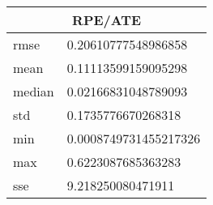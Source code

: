 \begin{table}[!ht] 
 \centering 
 \begin{tabular}{|l|l|} \hline 
 \multicolumn{2}{|c|}{RPE/ATE} \\ \hline 
 rmse & 0.20610777548986858 \\ \hline 
mean & 0.11113599159095298 \\ \hline 
median & 0.02166831048789093 \\ \hline 
std & 0.1735776670268318 \\ \hline 
min & 0.0008749731455217326 \\ \hline 
max & 0.6223087685363283 \\ \hline 
sse & 9.218250080471911 \\ \hline 
\end{tabular} 
 \end{table}